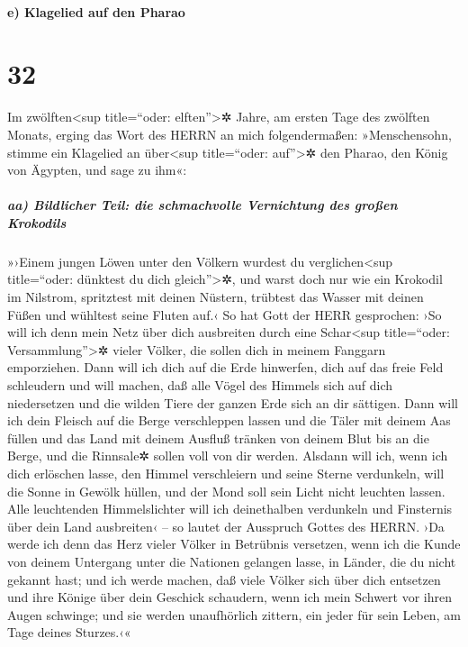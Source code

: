 \hypertarget{e-klagelied-auf-den-pharao}{%
\paragraph{e) Klagelied auf den
Pharao}\label{e-klagelied-auf-den-pharao}}

\hypertarget{section-31}{%
\section{32}\label{section-31}}

Im zwölften\textless sup title=``oder:
elften''\textgreater✲ Jahre, am ersten Tage des zwölften Monats, erging
das Wort des HERRN an mich folgendermaßen: »Menschensohn,
stimme ein Klagelied an über\textless sup title=``oder:
auf''\textgreater✲ den Pharao, den König von Ägypten, und sage zu ihm«:

\hypertarget{aa-bildlicher-teil-die-schmachvolle-vernichtung-des-grouxdfen-krokodils}{%
\subparagraph{aa) Bildlicher Teil: die schmachvolle Vernichtung des
großen
Krokodils}\label{aa-bildlicher-teil-die-schmachvolle-vernichtung-des-grouxdfen-krokodils}}

»›Einem jungen Löwen unter den Völkern wurdest du
verglichen\textless sup title=``oder: dünktest du dich
gleich''\textgreater✲, und warst doch nur wie ein Krokodil im Nilstrom,
spritztest mit deinen Nüstern, trübtest das Wasser mit deinen Füßen und
wühltest seine Fluten auf.‹ So hat Gott der HERR
gesprochen: ›So will ich denn mein Netz über dich ausbreiten durch eine
Schar\textless sup title=``oder: Versammlung''\textgreater✲ vieler
Völker, die sollen dich in meinem Fanggarn emporziehen.
Dann will ich dich auf die Erde hinwerfen, dich auf das
freie Feld schleudern und will machen, daß alle Vögel des Himmels sich
auf dich niedersetzen und die wilden Tiere der ganzen Erde sich an dir
sättigen. Dann will ich dein Fleisch auf die Berge
verschleppen lassen und die Täler mit deinem Aas füllen
und das Land mit deinem Ausfluß tränken von deinem Blut
bis an die Berge, und die Rinnsale✲ sollen voll von dir werden.
Alsdann will ich, wenn ich dich erlöschen lasse, den
Himmel verschleiern und seine Sterne verdunkeln, will die Sonne in
Gewölk hüllen, und der Mond soll sein Licht nicht leuchten lassen.
Alle leuchtenden Himmelslichter will ich deinethalben
verdunkeln und Finsternis über dein Land ausbreiten‹ -- so lautet der
Ausspruch Gottes des HERRN. ›Da werde ich denn das Herz
vieler Völker in Betrübnis versetzen, wenn ich die Kunde von deinem
Untergang unter die Nationen gelangen lasse, in Länder, die du nicht
gekannt hast; und ich werde machen, daß viele Völker sich
über dich entsetzen und ihre Könige über dein Geschick schaudern, wenn
ich mein Schwert vor ihren Augen schwinge; und sie werden unaufhörlich
zittern, ein jeder für sein Leben, am Tage deines Sturzes.‹«

